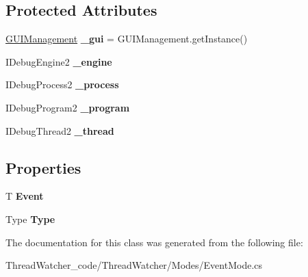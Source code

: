 \subsection*{Protected Attributes}
\begin{DoxyCompactItemize}
\item 
\hypertarget{class_thread_watcher_1_1_modes_1_1_event_mode_3_01_t_01_4_ab3988509277f79deee95c38e5ceac2ed}{\hyperlink{class_thread_watcher_1_1_g_u_i_1_1_g_u_i_management}{G\+U\+I\+Management} {\bfseries \+\_\+gui} = G\+U\+I\+Management.\+get\+Instance()}\label{class_thread_watcher_1_1_modes_1_1_event_mode_3_01_t_01_4_ab3988509277f79deee95c38e5ceac2ed}

\item 
\hypertarget{class_thread_watcher_1_1_modes_1_1_event_mode_3_01_t_01_4_a88f898a8d255e82de419d5b8726c01fe}{I\+Debug\+Engine2 {\bfseries \+\_\+engine}}\label{class_thread_watcher_1_1_modes_1_1_event_mode_3_01_t_01_4_a88f898a8d255e82de419d5b8726c01fe}

\item 
\hypertarget{class_thread_watcher_1_1_modes_1_1_event_mode_3_01_t_01_4_a2e52d3e1d991a2f15ea0c7f3a08e3906}{I\+Debug\+Process2 {\bfseries \+\_\+process}}\label{class_thread_watcher_1_1_modes_1_1_event_mode_3_01_t_01_4_a2e52d3e1d991a2f15ea0c7f3a08e3906}

\item 
\hypertarget{class_thread_watcher_1_1_modes_1_1_event_mode_3_01_t_01_4_aaf403d5ad608c10b421376a5c1a55721}{I\+Debug\+Program2 {\bfseries \+\_\+program}}\label{class_thread_watcher_1_1_modes_1_1_event_mode_3_01_t_01_4_aaf403d5ad608c10b421376a5c1a55721}

\item 
\hypertarget{class_thread_watcher_1_1_modes_1_1_event_mode_3_01_t_01_4_a3c305b5a185c63a4d63e59e7d02c94f7}{I\+Debug\+Thread2 {\bfseries \+\_\+thread}}\label{class_thread_watcher_1_1_modes_1_1_event_mode_3_01_t_01_4_a3c305b5a185c63a4d63e59e7d02c94f7}

\end{DoxyCompactItemize}
\subsection*{Properties}
\begin{DoxyCompactItemize}
\item 
\hypertarget{class_thread_watcher_1_1_modes_1_1_event_mode_3_01_t_01_4_af217da6e97eba5b22077ae1a4dec3958}{T {\bfseries Event}}\label{class_thread_watcher_1_1_modes_1_1_event_mode_3_01_t_01_4_af217da6e97eba5b22077ae1a4dec3958}

\item 
\hypertarget{class_thread_watcher_1_1_modes_1_1_event_mode_3_01_t_01_4_a8d6c0f5560f37ed2154d1cf1db89cbd1}{Type {\bfseries Type}}\label{class_thread_watcher_1_1_modes_1_1_event_mode_3_01_t_01_4_a8d6c0f5560f37ed2154d1cf1db89cbd1}

\end{DoxyCompactItemize}


The documentation for this class was generated from the following file\+:\begin{DoxyCompactItemize}
\item 
Thread\+Watcher\+\_\+code/\+Thread\+Watcher/\+Modes/Event\+Mode.\+cs\end{DoxyCompactItemize}
